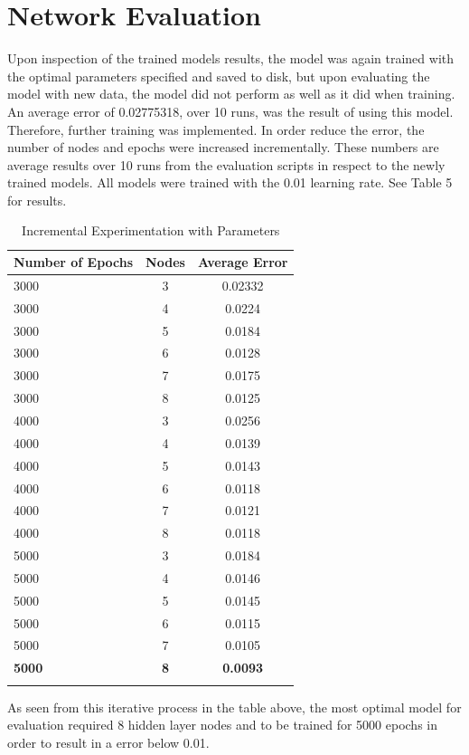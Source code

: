 \section*{Network Evaluation}
Upon inspection of the trained models results, the model was again trained with the optimal parameters specified and saved to disk, but upon evaluating the model with new data, the model did not perform as well as it did when training.
An average error of 0.02775318, over 10 runs, was the result of using this model. Therefore, further training was implemented. In order reduce the error, the number of nodes and epochs were increased incrementally. These numbers are average results over 10 runs from the evaluation scripts in respect to the newly trained models. All models were trained with the 0.01 learning rate. See Table 5 for results.

 \begin{longtable}{|>{}p{4cm}|c|c|}
	\hline 
	Number of Epochs & Nodes & Average Error\\ 
	\hline 
	3000 & 3 & 0.02332\\ 
	\hline 
	3000 & 4 & 0.0224\\ 
	\hline 
	3000 & 5 & 0.0184\\ 
	\hline
	3000 & 6 & 0.0128\\ 
	\hline	
	3000 & 7 & 0.0175\\ 
	\hline
	3000 & 8 & 0.0125\\ 
	\hline 
	\hline
	4000 & 3 & 0.0256\\ 
	\hline	
	4000 & 4 & 0.0139\\ 
	\hline	
	4000 & 5 & 0.0143\\ 
	\hline	
 	4000 & 6 & 0.0118\\ 
	\hline	
 	4000 & 7 & 0.0121\\ 
	\hline
 	4000 & 8 & 0.0118\\ 
	\hline
	\hline
	5000 & 3 & 0.0184\\ 
	\hline	
	5000 & 4 & 0.0146\\ 
	\hline	
	5000 & 5 & 0.0145\\ 
	\hline	
	5000 & 6 & 0.0115\\ 
	\hline	
	5000 & 7 & 0.0105\\ 
	\hline
	\textbf{5000} &\textbf{8 }& \textbf{0.0093}\\
	\hline 
	\caption{Incremental Experimentation with Parameters}
\end{longtable}

As seen from this iterative process in the table above, the most optimal model for evaluation required 8 hidden layer nodes and to be trained for 5000 epochs in order to result in a error below 0.01.



